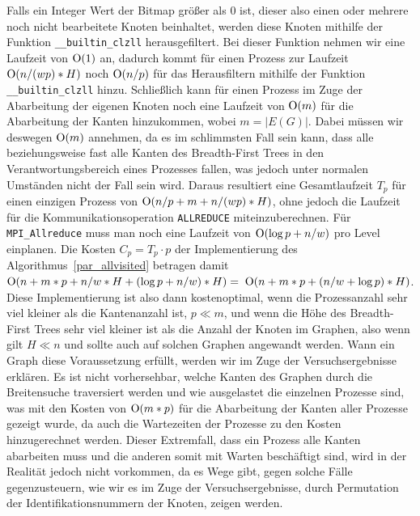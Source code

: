 \documentclass[11pt,a4paper]{article}
\begin{document}
Falls ein Integer Wert der Bitmap größer als 0 ist, dieser also einen oder mehrere noch nicht bearbeitete Knoten beinhaltet, werden diese Knoten mithilfe der Funktion \lstinline{__builtin_clzll} herausgefiltert. Bei dieser Funktion nehmen wir eine Laufzeit von \($O$(1)\) an, dadurch kommt für einen Prozess zur Laufzeit \($O$(n/(wp)*H)\) noch \($O$(n/p)\) für das Herausfiltern mithilfe der Funktion \lstinline{__builtin_clzll} hinzu. Schließlich kann für einen Prozess im Zuge der Abarbeitung der eigenen Knoten noch eine Laufzeit von \($O$(m)\) für die Abarbeitung der Kanten hinzukommen, wobei \(m = |E(G)|\). Dabei müssen wir deswegen \($O$(m)\) annehmen, da es im schlimmsten Fall sein kann, dass alle beziehungsweise fast alle Kanten des Breadth-First Trees in den Verantwortungsbereich eines Prozesses fallen, was jedoch unter normalen Umständen nicht der Fall sein wird. Daraus resultiert eine Gesamtlaufzeit \(T_{p}\) für einen einzigen Prozess von \($O$(n/p + m + n/(wp)*H)\), ohne jedoch die Laufzeit für die Kommunikationsoperation \lstinline{ALLREDUCE} miteinzuberechnen. Für \lstinline{MPI_Allreduce} muss man noch eine Laufzeit von \($O$(\log{p}+n/w)\) pro Level einplanen. Die Kosten \(C_{p} = T_{p} \cdot p\) der Implementierung des Algorithmus~\ref{par_allvisited} betragen damit \($O$(n + m*p + n/w*H + (\log{p}+n/w)*H) = \) \($O$(n + m*p + (n/w+\log{p})*H)\). Diese Implementierung ist also dann kostenoptimal, wenn die Prozessanzahl sehr viel kleiner als die Kantenanzahl ist, \(p \ll m\), und wenn die Höhe des Breadth-First Trees sehr viel kleiner ist als die Anzahl der Knoten im Graphen, also wenn gilt \(H \ll n\) und sollte auch auf solchen Graphen angewandt werden. Wann ein Graph diese Voraussetzung erfüllt, werden wir im Zuge der Versuchsergebnisse erklären. Es ist nicht vorhersehbar, welche Kanten des Graphen durch die Breitensuche traversiert werden und wie ausgelastet die einzelnen Prozesse sind, was mit den Kosten von \($O$(m*p)\) für die Abarbeitung der Kanten aller Prozesse gezeigt wurde, da auch die Wartezeiten der Prozesse zu den Kosten hinzugerechnet werden. Dieser Extremfall, dass ein Prozess alle Kanten abarbeiten muss und die anderen somit mit Warten beschäftigt sind, wird in der Realität jedoch nicht vorkommen, da es Wege gibt, gegen solche Fälle gegenzusteuern, wie wir es im Zuge der Versuchsergebnisse, durch Permutation der Identifikationsnummern der Knoten, zeigen werden.\\
\end{document}
